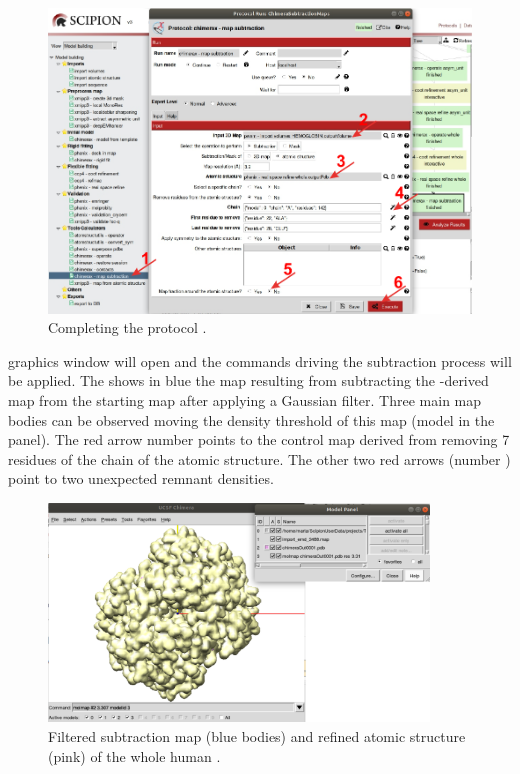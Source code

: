 \begin{itemize}
 \begin{figure}[H]
    \centering 
    \captionsetup{width=.9\linewidth} 
    \includegraphics[width=1\textwidth]{Images/Fig42}
    \caption{Completing the protocol .}
    \label{fig:chimera_map_subtract}
   \end{figure}
   
\chimera graphics window will open and the commands driving the subtraction process will be applied. The  shows in blue the map resulting from subtracting the -derived map from the starting map  after applying a Gaussian filter. Three main map bodies can be observed moving the density threshold of this map (model  in the  panel). The red arrow number  points to the control map derived from removing 7 residues of the chain  of the atomic structure. The other two red arrows (number ) point to two unexpected remnant densities. 

  \begin{figure}[H]
    \centering 
    \captionsetup{width=.9\linewidth} 
    \includegraphics[width=0.90\textwidth]{Images/Fig43}
    \caption{Filtered subtraction map (blue bodies) and refined atomic structure (pink) of the whole human .}
    \label{fig:chimera_map_subtract_2}
   \end{figure}


\end{itemize}
